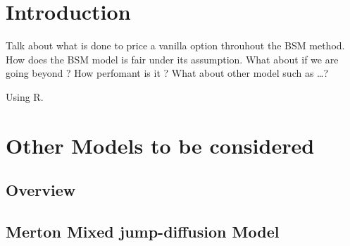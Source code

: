 \documentclass[12pt]{report}
\begin{document}

\tableofcontents{}



%
%
\chapter*{Introduction}
\label{cha:Introduction}

Talk about what is done to price a vanilla option throuhout the BSM method.
How does the BSM model is fair under its assumption. What about if we are going beyond ?
How perfomant is it ? 
What about other model such as \ldots ?

Using R. \cite{R}
%
%
\chapter{Other Models to be considered}
\label{cha:OtherModel}


\section{Overview}
\label{sub:OverviewJump}

\section{Merton Mixed jump-diffusion Model}
\label{sec:other:merton}
\end{document}
